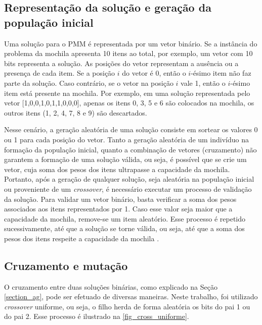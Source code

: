 \subsection{Representação da solução e geração da população inicial}
\label{section_representacao_pmm}
Uma solução para o PMM é representada por um vetor binário. Se a instância do problema da mochila apresenta 10 itens ao total, por exemplo, um vetor com 10 bits representa a solução. As posições do vetor representam a ausência ou a presença de cada item. Se a posição $i$ do vetor é 0, então o $i$-ésimo item não faz parte da solução. Caso contrário, se o vetor na posição $i$ vale 1, então o  $i$-ésimo item está presente na mochila. Por exemplo, em uma solução representada pelo vetor [1,0,0,1,0,1,1,0,0,0], apenas os itens 0, 3, 5 e 6 são colocados na mochila, os outros itens (1, 2, 4, 7, 8 e 9) são descartados.

Nesse cenário, a geração aleatória de uma solução consiste em sortear os valores 0 ou 1 para cada posição do vetor. Tanto a geração aleatória de um indivíduo na formação da população inicial, quanto a combinação de vetores (cruzamento) não garantem a formação de uma solução válida, ou seja, é possível que se crie um vetor, cuja soma dos pesos dos itens ultrapasse a capacidade da mochila. Portanto, após a geração de qualquer solução, seja aleatória na população inicial ou proveniente de um \textit{crossover}, é necessário executar um processo de validação da solução. Para validar um vetor binário, basta verificar a soma dos pesos associados aos itens representados por 1. Caso esse valor seja maior que a capacidade da mochila, remove-se um item aleatório. Esse processo é repetido sucessivamente, até que a solução se torne válida, ou seja, até que a soma dos pesos dos itens respeite a capacidade da mochila \cite{Ishibuchi2015}.

\subsection{Cruzamento e mutação}
O cruzamento entre duas soluções binárias, como explicado na Seção \ref{section_ag}, pode ser efetuado de diversas maneiras. Neste trabalho, foi utilizado \textit{crossover} uniforme, ou seja, o filho herda de forma aleatória os bits do pai 1 ou do pai 2. Esse processo é ilustrado na \autoref{fig_cross_uniforme}.

